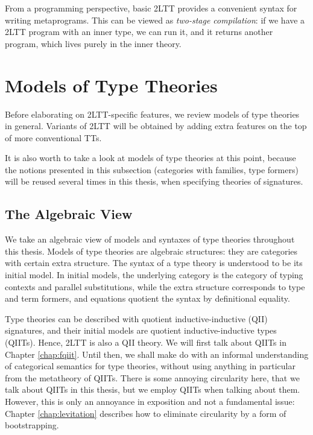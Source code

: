 \documentclass[12pt,a4paper,twoside,openany]{book}
\theoremstyle{remark}
\theoremstyle{definition}
\begin{document}
From a programming perspective, basic 2LTT provides a convenient syntax for
writing metaprograms. This can be viewed as \emph{two-stage compilation}: if we
have a 2LTT program with an inner type, we can run it, and it returns another
program, which lives purely in the inner theory.

\section{Models of Type Theories}

Before elaborating on 2LTT-specific features, we review models of type theories
in general. Variants of 2LTT will be obtained by adding extra features on the
top of more conventional TTs.

It is also worth to take a look at models of type theories at this point,
because the notions presented in this subsection (categories with families, type
formers) will be reused several times in this thesis, when specifying theories
of signatures.

\subsection{The Algebraic View}

We take an algebraic view \cite{TODO} of models and syntaxes of type theories throughout
this thesis. Models of type theories are algebraic structures: they are
categories with certain extra structure. The syntax of a type theory is
understood to be its initial model. In initial models, the underlying category
is the category of typing contexts and parallel substitutions, while the extra
structure corresponds to type and term formers, and equations quotient the
syntax by definitional equality.

Type theories can be described with quotient inductive-inductive (QII)
signatures, and their initial models are quotient inductive-inductive types
(QIITs). Hence, 2LTT is also a QII theory. We will first talk about QIITs in
Chapter \ref{chap:fqiit}. Until then, we shall make do with an informal
understanding of categorical semantics for type theories, without using anything
in particular from the metatheory of QIITs. There is some annoying circularity
here, that we talk about QIITs in this thesis, but we employ QIITs when talking
about them. However, this is only an annoyance in exposition and not a
fundamental issue: Chapter \ref{chap:levitation} describes how to eliminate
circularity by a form of bootstrapping.
\end{document}
